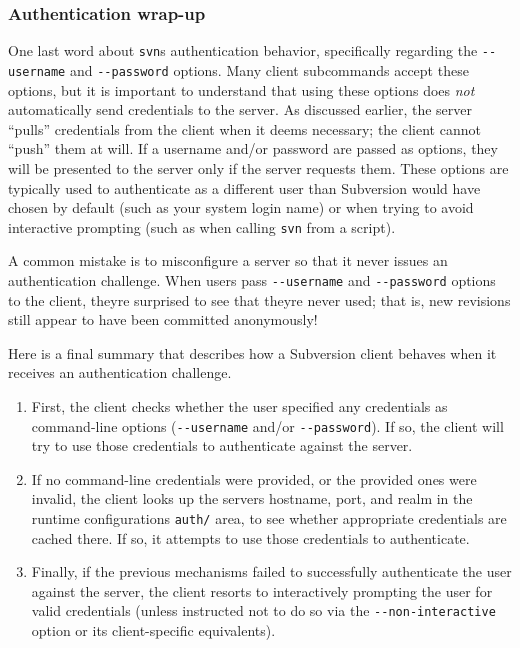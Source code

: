 \subsubsection{Authentication
wrap-up}\label{svn.tour.initial.authn-wrapup}

One last word about \texttt{svn}\textquotesingle s authentication
behavior, specifically regarding the \texttt{-\/-username} and
\texttt{-\/-password} options. Many client subcommands accept these
options, but it is important to understand that using these options does
\emph{not} automatically send credentials to the server. As discussed
earlier, the server ``pulls'' credentials from the client when it deems
necessary; the client cannot ``push'' them at will. If a username and/or
password are passed as options, they will be presented to the server
only if the server requests them. These options are typically used to
authenticate as a different user than Subversion would have chosen by
default (such as your system login name) or when trying to avoid
interactive prompting (such as when calling \texttt{svn} from a script).

A common mistake is to misconfigure a server so that it never issues an
authentication challenge. When users pass \texttt{-\/-username} and
\texttt{-\/-password} options to the client, they\textquotesingle re
surprised to see that they\textquotesingle re never used; that is, new
revisions still appear to have been committed anonymously!

Here is a final summary that describes how a Subversion client behaves
when it receives an authentication challenge.

\begin{enumerate}
\def\labelenumi{\arabic{enumi}.}
\item
  First, the client checks whether the user specified any credentials as
  command-line options (\texttt{-\/-username} and/or
  \texttt{-\/-password}). If so, the client will try to use those
  credentials to authenticate against the server.
\item
  If no command-line credentials were provided, or the provided ones
  were invalid, the client looks up the server\textquotesingle s
  hostname, port, and realm in the runtime
  configuration\textquotesingle s \texttt{auth/} area, to see whether
  appropriate credentials are cached there. If so, it attempts to use
  those credentials to authenticate.
\item
  Finally, if the previous mechanisms failed to successfully
  authenticate the user against the server, the client resorts to
  interactively prompting the user for valid credentials (unless
  instructed not to do so via the \texttt{-\/-non-interactive} option or
  its client-specific equivalents).
\end{enumerate}

